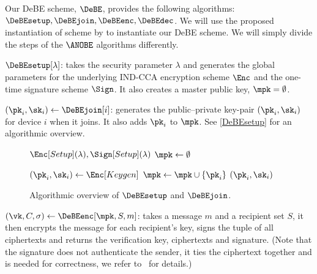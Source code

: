 \NewAlgorithm{\DeBEsetup}{\DeBE[Setup]}
\NewAlgorithm{\DeBEjoin}{\DeBE[Join]}
\NewAlgorithm{\DeBEenc}{\DeBE[Enc]}
\NewAlgorithm{\DeBEdec}{\DeBE[Dec]}

Our \ac{DeBE} scheme, \(\DeBE\), provides the following algorithms:
\(\DeBEsetup, \allowbreak \DeBEjoin, \allowbreak \DeBEenc, \allowbreak 
  \DeBEdec\).
We will use the proposed instantiation of  scheme by \textcite{ANOBE} 
to instantiate our \ac{DeBE} scheme.
We will simply divide the steps of the \(\ANOBE\) algorithms differently.


\(\DeBEsetup[\lambda]\): takes the security parameter \(\lambda\) and generates 
the global parameters for the underlying IND-CCA encryption scheme \(\Enc\) and 
the one-time signature scheme \(\Sign\).
It also creates a master public key, \(\mpk = \emptyset\).


\((\pk_i, \sk_i)\gets \DeBEjoin[i]\): generates the public--private key-pair 
\((\pk_i, \sk_i)\) for device \(i\) when it joins.
It also adds \(\pk_i\) to \(\mpk\).
See \cref{DeBEsetup} for an algorithmic overview.

\begin{figure}
  \begin{algorithmic}

    \Function{\DeBEsetup}{$\lambda$}
      \State $\Enc[Setup](\lambda), \Sign[Setup](\lambda)$
      \State $\mpk\gets \emptyset$
    \EndFunction

      \State $(\pk_i, \sk_i)\gets \Enc[Keygen]$
      \State $\mpk\gets \mpk\cup \{\pk_i\}$
      \State \Return $(\pk_i, \sk_i)$
    \EndFunction
  \end{algorithmic}
  \caption{\label{DeBEsetup}\label{DeBEjoin}%
    Algorithmic overview of \(\DeBEsetup\) and \(\DeBEjoin\).
  }
\end{figure}


\((\vk, C, \sigma)\gets \DeBEenc[\mpk, S, m]\):
takes a message \(m\) and a recipient set \(S\), it then encrypts the message 
for each recipient's key, signs the tuple of all ciphertexts and returns the 
verification key, ciphertexts and signature.
(Note that the signature does not authenticate the sender, it ties the 
ciphertext together and is needed for correctness, we refer to~\cite{ANOBE} for 
details.)

